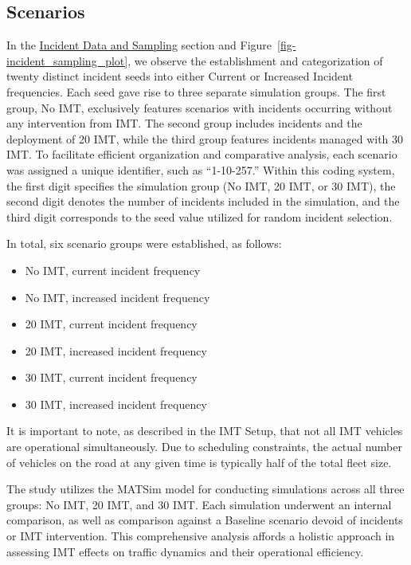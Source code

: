 \documentclass[fancy, oneside, mastersfancy, ms]{byuthesis}
\providecommand{\tightlist}{%
  \setlength{\itemsep}{0pt}\setlength{\parskip}{0pt}}\usepackage{longtable,booktabs,array}
\begin{document}
\hypertarget{sec-scenarios}{%
\subsection{Scenarios}\label{sec-scenarios}}

In the \protect\hyperlink{sec-inc_data}{Incident Data and Sampling}
section and Figure~\ref{fig-incident_sampling_plot}, we observe the
establishment and categorization of twenty distinct incident seeds into
either Current or Increased Incident frequencies. Each seed gave rise to
three separate simulation groups. The first group, No IMT, exclusively
features scenarios with incidents occurring without any intervention
from IMT. The second group includes incidents and the deployment of 20
IMT, while the third group features incidents managed with 30 IMT. To
facilitate efficient organization and comparative analysis, each
scenario was assigned a unique identifier, such as ``1-10-257.'' Within
this coding system, the first digit specifies the simulation group (No
IMT, 20 IMT, or 30 IMT), the second digit denotes the number of
incidents included in the simulation, and the third digit corresponds to
the seed value utilized for random incident selection.

In total, six scenario groups were established, as follows:

\begin{itemize}
\tightlist
\item
  No IMT, current incident frequency
\item
  No IMT, increased incident frequency
\item
  20 IMT, current incident frequency
\item
  20 IMT, increased incident frequency
\item
  30 IMT, current incident frequency
\item
  30 IMT, increased incident frequency
\end{itemize}

It is important to note, as described in the IMT Setup, that not all IMT
vehicles are operational simultaneously. Due to scheduling constraints,
the actual number of vehicles on the road at any given time is typically
half of the total fleet size.

The study utilizes the MATSim model for conducting simulations across
all three groups: No IMT, 20 IMT, and 30 IMT. Each simulation underwent
an internal comparison, as well as comparison against a Baseline
scenario devoid of incidents or IMT intervention. This comprehensive
analysis affords a holistic approach in assessing IMT effects on traffic
dynamics and their operational efficiency.
\end{document}
